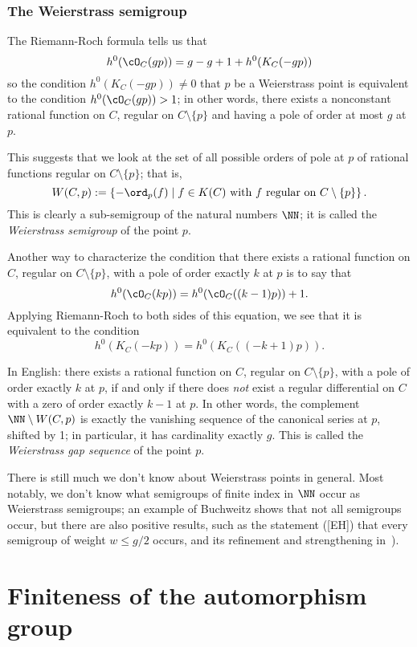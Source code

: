\subsubsection{The Weierstrass semigroup} 

The Riemann-Roch formula tells us that
$$
h^0(\cO_C(gp)) = g - g + 1 + h^0(K_C(-gp))
$$
so the condition $h^0(K_C(-gp)) \neq 0$ that $p$ be a Weierstrass point is equivalent to the condition $h^0(\cO_C(gp)) > 1$; in other words, there exists a nonconstant rational function on $C$, regular on $C \setminus \{p\}$ and having a pole of order at most $g$ at $p$.

This suggests that we look at the set of all possible orders of pole at $p$ of rational functions regular on $C \setminus \{p\}$; that is,
$$
W(C,p) := \left\{ -\ord_p(f) \mid f \in K(C) \text{ with $f$ regular on } C \setminus \{p\} \right\}.
$$
This is clearly a sub-semigroup of the natural numbers $\NN$; it is called the \emph{Weierstrass semigroup} of the point $p$.  

Another way to characterize the condition that there exists a rational function on $C$, regular on $C \setminus \{p\}$, with a pole of order exactly $k$ at $p$ is to say that
$$
h^0(\cO_C(kp)) = h^0(\cO_C((k-1)p)) + 1.
$$
Applying Riemann-Roch to both sides of this equation, we see that it is equivalent to the condition
$$
h^0(K_C(-kp)) = h^0(K_C((-k+1)p)).
$$

In English: there exists a rational function on $C$, regular on $C \setminus \{p\}$, with a pole of order exactly $k$ at $p$, if and only if there does \emph{not} exist a regular differential on $C$ with a zero of order exactly $k-1$ at $p$.
 In other words, the complement $\NN \setminus W(C,p)$ is exactly the vanishing sequence of the canonical series at $p$, shifted by 1; in particular, it has cardinality  exactly $g$. This is called the \emph{Weierstrass gap sequence} of the point $p$.

There is still much we don't know about Weierstrass points in general. Most notably, we don't know what semigroups of finite index in $\NN$ occur as Weierstrass semigroups; an example of Buchweitz shows that not all semigroups occur, but there are also positive results, such as the statement ([EH]) that every semigroup of weight $w \leq g/2$ occurs, and its refinement and strengthening in~\cite{MR3892968}).


\section{Finiteness of the automorphism group}\label{finiteness section}

